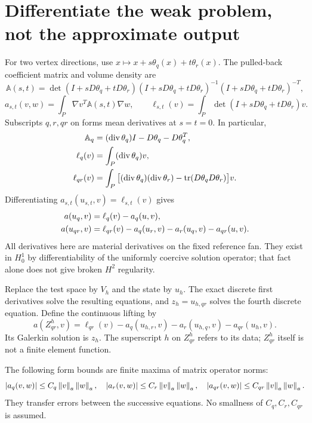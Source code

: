 \section{Differentiate the weak problem, not the approximate output}
\label{l2:pullback}
For two vertex directions, use
$x\mapsto x+s\theta_q(x)+t\theta_r(x)$. The pulled-back coefficient matrix
and volume density are
\[
 \mathbb A(s,t)=\det(I+sD\theta_q+tD\theta_r)
 (I+sD\theta_q+tD\theta_r)^{-1}
 (I+sD\theta_q+tD\theta_r)^{-T},
\]
\[
 a_{s,t}(v,w)=\int_P\nabla v^T\mathbb A(s,t)\nabla w,
 \qquad
 \ell_{s,t}(v)=\int_P\det(I+sD\theta_q+tD\theta_r)v.
\]
Subscripts $q,r,qr$ on forms mean derivatives at $s=t=0$.
In particular,
\begin{align*}
 \mathbb A_q&=(\operatorname{div}\theta_q)I-D\theta_q-D\theta_q^T,\\
 \ell_q(v)&=\int_P(\operatorname{div}\theta_q)v,\\
 \ell_{qr}(v)&=\int_P\big[(\operatorname{div}\theta_q)
 (\operatorname{div}\theta_r)-\operatorname{tr}(D\theta_qD\theta_r)\big]v.
\end{align*}
Differentiating $a_{s,t}(u_{s,t},v)=\ell_{s,t}(v)$ gives
\begin{align}
 a(u_q,v)&=\ell_q(v)-a_q(u,v),\notag\\
 a(u_{qr},v)&=\ell_{qr}(v)-a_q(u_r,v)-a_r(u_q,v)-a_{qr}(u,v).
 \label{l2:exactderivatives}
\end{align}
All derivatives here are material derivatives on the fixed reference fan.
They exist in $H^1_0$ by differentiability of the uniformly coercive
solution operator; that fact alone does not give broken $H^2$ regularity.

Replace the test space by $V_h$ and the state by $u_h$. The exact discrete
first derivatives solve the resulting equations, and $z_h=u_{h,qr}$
solves the fourth discrete equation. Define the continuous lifting by
\begin{equation}
 a(Z_{qr}^h,v)=\ell_{qr}(v)-a_q(u_{h,r},v)
                    -a_r(u_{h,q},v)-a_{qr}(u_h,v).
 \label{l2:lifting}
\end{equation}
Its Galerkin solution is $z_h$. The superscript $h$ on $Z_{qr}^h$ refers
to its data; $Z_{qr}^h$ itself is not a finite element function.

The following form bounds are finite maxima of matrix operator norms:
\[
 |a_q(v,w)|\leq C_q\left\|v\right\|_a\left\|w\right\|_a,\quad
 |a_r(v,w)|\leq C_r\left\|v\right\|_a\left\|w\right\|_a,\quad
 |a_{qr}(v,w)|\leq C_{qr}\left\|v\right\|_a\left\|w\right\|_a.
\]
They transfer errors between the successive equations. No smallness of
$C_q,C_r,C_{qr}$ is assumed.

